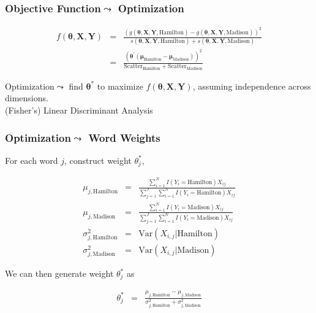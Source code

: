 \documentclass{beamer}
\numberwithin{equation}{section}
\begin{document}
\begin{frame}
\frametitle{Objective Function$\leadsto$ Optimization}

\begin{eqnarray}
f(\boldsymbol{\theta}, \boldsymbol{X}, \boldsymbol{Y} ) & = & \frac{\left(g(\boldsymbol{\theta}, \boldsymbol{X}, \boldsymbol{Y},  \text{Hamilton}) - g(\boldsymbol{\theta}, \boldsymbol{X}, \boldsymbol{Y},  \text{Madison}) \right)^2}{s(\boldsymbol{\theta}, \boldsymbol{X}, \boldsymbol{Y},  \text{Hamilton})  + s(\boldsymbol{\theta}, \boldsymbol{X}, \boldsymbol{Y},  \text{Madison}) } \nonumber\\
& =&  \frac{\left(\boldsymbol{\theta}^{'} ( \boldsymbol{\mu}_{\text{Hamilton}} - \boldsymbol{\mu}_{\text{Madison}})     \right)^2  }{\text{Scatter}_{\text{Hamilton}} + \text{Scatter}_{\text{Madison}}    } \nonumber
\end{eqnarray}


\alert{Optimization}$\leadsto$ find $\boldsymbol{\theta}^{*}$ to maximize $f(\boldsymbol{\theta}, \boldsymbol{X}, \boldsymbol{Y} ) $, assuming independence across dimensions.\\

\alert{(Fisher's) Linear Discriminant Analysis}



\end{frame}





\begin{frame}
\frametitle{Optimization$\leadsto$ Word Weights}

For each word $j$, construct weight $\theta^{*}_{j}$,
\begin{small}
\begin{eqnarray}
\mu_{j, \text{Hamilton}} & = & \frac{\sum_{i = 1}^{N} I(Y_{i} = \text{Hamilton}) X_{ij} }{\sum_{j=1}^{J} \sum_{i = 1}^{N} I(Y_{i} = \text{Hamilton}) X_{ij} } \nonumber \\
\mu_{j, \text{Madison}} & = & \frac{\sum_{i = 1}^{N} I(Y_{i} = \text{Madison}) X_{ij} }{\sum_{j=1}^{J} \sum_{i = 1}^{N} I(Y_{i} = \text{Madison}) X_{ij} } \nonumber \\
\sigma^{2}_{j, \text{Hamilton}} & = & \text{Var}(X_{i,j} |  \text{Hamilton}) \nonumber \\
\sigma^{2}_{j, \text{Madison} }& = & \text{Var}(X_{i,j} | \text{Madison}) \nonumber
\end{eqnarray}
\end{small}


We can then generate weight $\theta^{*}_{j}$ as

\begin{eqnarray}
\theta^{*}_j &= & \frac{\mu_{j, \text{Hamilton}}  - \mu_{j, \text{Madison}}  } {\sigma_{j, \text{Hamilton}}^{2} + \sigma_{j, \text{Madison}}^{2}    }  \nonumber
\end{eqnarray}




\end{frame}
\end{document}
